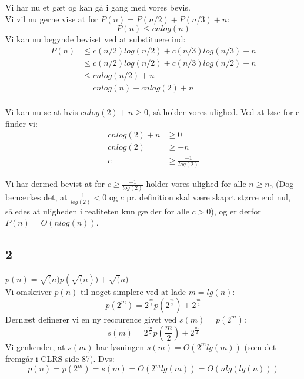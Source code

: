 Vi har nu et gæt og kan gå i gang med vores bevis.\\
Vi vil nu gerne vise at for $P(n) = P(n/2) + P(n/3) + n$:
\begin{equation*}
	P(n) \leq cnlog(n)
\end{equation*}
Vi kan nu begynde beviset ved at substituere ind:
\begin{align*}
	P(n) &\leq c(n/2)log(n/2) + c(n/3)log(n/3) + n\\
	&\leq c(n/2)log(n/2) + c(n/3)log(n/2) + n\\
	&\leq cnlog(n/2) + n\\
	&= cnlog(n) + cnlog(2) + n\\
\end{align*}

Vi kan nu se at hvis $cnlog(2) + n \geq 0$, så holder vores ulighed. Ved at løse for c finder vi:
\begin{align*}
	cnlog(2) + n &\geq 0\\
	cnlog(2) &\geq -n\\
	c &\geq \frac{-1}{log(2)}
\end{align*}

Vi har dermed bevist at for $c \geq \frac{-1}{log(2)}$ holder vores ulighed for alle $n \geq n_0$ (Dog bemærkes det, at $\frac{-1}{log(2)} < 0$ og $c$ pr. definition skal være skaprt større end nul, således at uligheden i realiteten kun gælder for alle $c > 0$), og er derfor $P(n) = O(nlog(n))$.

\subsection{2}

$p(n) = \sqrt(n)p(\sqrt(n)) + \sqrt(n)$\\
Vi omskriver $p(n)$ til noget simplere ved at lade $m = lg(n)$:
$$p(2^m) = 2^{\frac{m}{2}}p(2^{\frac{m}{2}}) + 2^{\frac{m}{2}}$$
Dernæst definerer vi en ny reccurence givet ved $s(m) = p(2^m)$:
$$s(m) = 2^{\frac{m}{2}}p(\frac{m}{2}) + 2^{\frac{m}{2}}$$
Vi genkender, at $s(m)$ har løsningen $s(m) = O(2^mlg(m))$ (som det fremgår i CLRS side 87).
Dvs:
$$p(n) = p(2^m) = s(m) = O(2^mlg(m)) = O(nlg(lg(n)))$$
